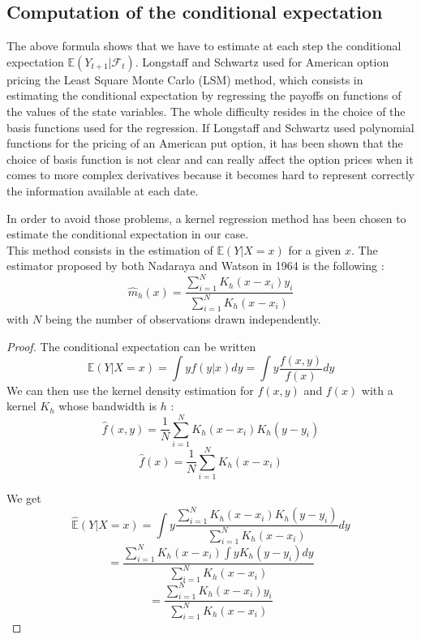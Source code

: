 \documentclass[a4paper,11pt,english]{book}
\begin{document}
\subsection{Computation of the conditional expectation}
\label{subsec:conditional-expectation}
The above formula shows that we have to estimate at each step the conditional expectation $\mathbb{E}(Y_{t+1}|\mathcal{F}_{t})$. Longstaff and Schwartz\cite{schwartz2001valuing} used for American option pricing the Least Square Monte Carlo (LSM) method, which consists in estimating the conditional expectation by regressing the payoffs on functions of the values of the state variables. The whole difficulty resides in the choice of the basis functions used for the regression. If Longstaff and Schwartz used polynomial functions for the pricing of an American put option, it has been shown that the choice of basis function is not clear and can really affect the option prices when it comes to more complex derivatives because it becomes hard to represent correctly the information available at each date\cite{moreno2003robustness}.

In order to avoid those problems, a kernel regression method has been chosen to estimate the conditional expectation in our case.\\

This method consists in the estimation of $\mathbb{E}(Y|X=x)$ for a given $x$. The estimator proposed by both Nadaraya\cite{nadaraya1964estimating} and Watson\cite{watson1964smooth} in 1964 is the following : $$\hat{m}_{h}(x)=\frac{\sum_{i=1}^{N}K_{h}(x-x_{i})y_{i}}{\sum_{i=1}^{N}K_{h}(x-x_{i})}$$
with $N$ being the number of observations drawn independently.\\

\begin{proof}
The conditional expectation can be written $$\mathbb{E}(Y|X=x)=\int yf(y|x)dy = \int y\frac{f(x,y)}{f(x)}dy$$
We can then use the kernel density estimation for $f(x,y)$ and $f(x)$ with a kernel $K_{h}$ whose bandwidth is $h$ : $$\hat{f}(x,y) = \frac{1}{N}\sum_{i=1}^{N}K_{h}(x-x_{i})K_{h}(y-y_{i})$$
$$\hat{f}(x) = \frac{1}{N}\sum_{i=1}^{N}K_{h}(x-x_{i})$$

We get $$\hat{\mathbb{E}}(Y|X=x) = \int y\frac{\sum_{i=1}^{N}K_{h}(x-x_{i})K_{h}(y-y_{i})}{\sum_{i=1}^{N}K_{h}(x-x_{i})}dy$$
$$=\frac{\sum_{i=1}^{N}K_{h}(x-x_{i})\int y K_{h}(y-y_{i})dy }{\sum_{i=1}^{N}K_{h}(x-x_{i})}$$
$$=\frac{\sum_{i=1}^{N}K_{h}(x-x_{i})y_{i}}{\sum_{i=1}^{N}K_{h}(x-x_{i})}$$
\end{proof}
\end{document}

